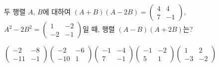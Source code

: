\hspace*{2mm}\begin{minipage}[t]{\dimexpr\linewidth-2mm\relax}\vspace{0pt}
두 행렬 $A$, $B$에 대하여 $(A+B)(A-2B)=\begin{pmatrix} 4 & 4 \\ 7 & -1 \end{pmatrix}$, $A^2-2B^2=\begin{pmatrix} 1 & -2 \\ -2 & -1 \end{pmatrix}$일 때, 행렬 $(A-B)(A+2B)$는?
\begin{choicesii}{$\begin{pmatrix} -2 & -8 \\ -11 & -1 \end{pmatrix}$}{$\begin{pmatrix} -2 & -6 \\ -10 & 1 \end{pmatrix}$}{$\begin{pmatrix} -1 & -4 \\ 7 & -1 \end{pmatrix}$}{$\begin{pmatrix} -1 & -2 \\ 5 & 1 \end{pmatrix}$}{$\begin{pmatrix} 1 & 2 \\ -3 & -2 \end{pmatrix}$}\end{choicesii}\end{minipage}
